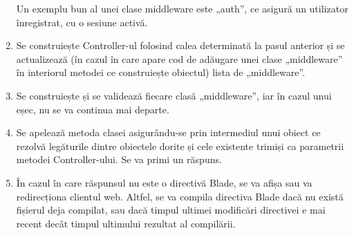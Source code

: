 \begin{enumerate}
			Un exemplu bun al unei clase middleware este „auth”, ce asigură un utilizator înregistrat, cu o sesiune activă.
		\item
			Se construiește Controller-ul folosind calea determinată la pasul anterior și se actualizează (în cazul în care apare cod de adăugare unei clase „middleware” în interiorul metodei ce construiește obiectul) lista de „middleware”.
		\item
			Se construiește și se validează fiecare clasă „middleware”, iar în cazul unui eșec, nu se va continua mai departe.
		\item
			Se apelează metoda clasei asigurându-se prin intermediul unui obiect ce rezolvă legăturile dintre obiectele dorite și cele existente trimiși ca parametrii metodei Controller-ului.
			Se va primi un răspuns.
		\item
			În cazul în care răspunsul nu este o directivă Blade, se va afișa sau va redirecționa clientul web.
			Altfel, se va compila directiva Blade dacă nu există fișierul deja compilat, sau dacă timpul ultimei modificări directivei e mai recent decât timpul ultimului rezultat al compilării.
	\end{enumerate}
